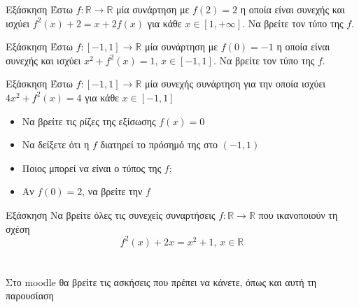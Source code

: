 \documentclass[greek]{beamer}
\begin{document}
\begin{frame}{Εξάσκηση}
  Έστω $f:\mathbb{R}\to\mathbb{R}$ μία συνάρτηση με $f(2)=2$ η οποία είναι συνεχής και ισχύει $f^2(x)+2=x+2f(x)$ για κάθε $x\in [1,+\infty]$. Να βρείτε τον τύπο της $f$.
\end{frame}

\begin{frame}{Εξάσκηση}
  Έστω $f:[-1,1]\to\mathbb{R}$ μία συνάρτηση με $f(0)=-1$ η οποία είναι συνεχής και ισχύει $x^2+f^2(x)=1$, $x\in [-1,1]$. Να βρείτε τον τύπο της $f$.
\end{frame}

\begin{frame}{Εξάσκηση}
  Έστω $f:[-1,1]\to\mathbb{R}$ μία συνεχής συνάρτηση για την οποία ισχύει $4x^2+f^2(x)=4$ για κάθε $x\in [-1,1]$
  \begin{itemize}
    \item Να βρείτε τις ρίζες της εξίσωσης $f(x)=0$
    \item Να δείξετε ότι η $f$ διατηρεί το πρόσημό της στο $(-1,1)$
    \item Ποιος μπορεί να είναι ο τύπος της $f$;
    \item Αν $f(0)=2$, να βρείτε την $f$
  \end{itemize}
\end{frame}

\begin{frame}{Εξάσκηση}
  Να βρείτε όλες τις συνεχείς συναρτήσεις $f:\mathbb{R}\to\mathbb{R}$ που ικανοποιούν τη σχέση
  $$f^2(x)+2x=x^2+1 \text{, } x\in\mathbb{R}$$
\end{frame}

\section{}
\begin{frame}
  Στο moodle θα βρείτε τις ασκήσεις που πρέπει να κάνετε, όπως και αυτή τη παρουσίαση
\end{frame}
\end{document}
